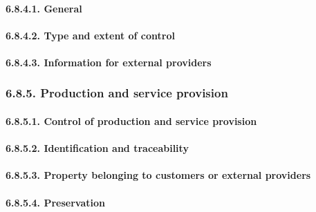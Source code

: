 \documentclass[
]{article}
\begin{document}
\hypertarget{general-14}{%
\paragraph{6.8.4.1. General}\label{general-14}}

\hypertarget{type-and-extent-of-control-1}{%
\paragraph{6.8.4.2. Type and extent of
control}\label{type-and-extent-of-control-1}}

\hypertarget{information-for-external-providers-1}{%
\paragraph{6.8.4.3. Information for external
providers}\label{information-for-external-providers-1}}

\hypertarget{production-and-service-provision-1}{%
\subsubsection{6.8.5. Production and service
provision}\label{production-and-service-provision-1}}

\hypertarget{control-of-production-and-service-provision-1}{%
\paragraph{6.8.5.1. Control of production and service
provision}\label{control-of-production-and-service-provision-1}}

\hypertarget{identification-and-traceability-1}{%
\paragraph{6.8.5.2. Identification and
traceability}\label{identification-and-traceability-1}}

\hypertarget{property-belonging-to-customers-or-external-providers-1}{%
\paragraph{6.8.5.3. Property belonging to customers or external
providers}\label{property-belonging-to-customers-or-external-providers-1}}

\hypertarget{preservation-1}{%
\paragraph{6.8.5.4. Preservation}\label{preservation-1}}
\end{document}
